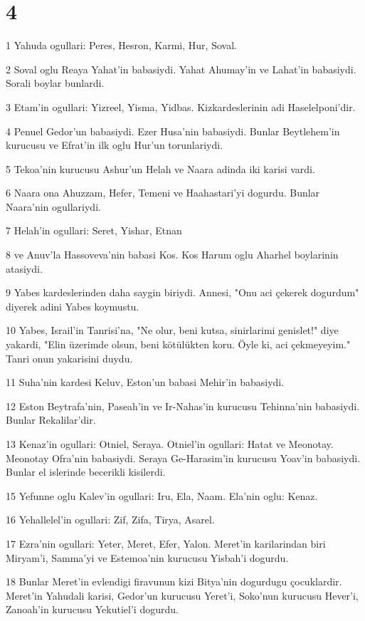 \chapter{4}

\par 1 Yahuda ogullari: Peres, Hesron, Karmi, Hur, Soval.
\par 2 Soval oglu Reaya Yahat'in babasiydi. Yahat Ahumay'in ve Lahat'in babasiydi. Sorali boylar bunlardi.
\par 3 Etam'in ogullari: Yizreel, Yisma, Yidbas. Kizkardeslerinin adi Haselelponi'dir.
\par 4 Penuel Gedor'un babasiydi. Ezer Husa'nin babasiydi. Bunlar Beytlehem'in kurucusu ve Efrat'in ilk oglu Hur'un torunlariydi.
\par 5 Tekoa'nin kurucusu Ashur'un Helah ve Naara adinda iki karisi vardi.
\par 6 Naara ona Ahuzzam, Hefer, Temeni ve Haahastari'yi dogurdu. Bunlar Naara'nin ogullariydi.
\par 7 Helah'in ogullari: Seret, Yishar, Etnan
\par 8 ve Anuv'la Hassoveva'nin babasi Kos. Kos Harum oglu Aharhel boylarinin atasiydi.
\par 9 Yabes kardeslerinden daha saygin biriydi. Annesi, "Onu aci çekerek dogurdum" diyerek adini Yabes koymustu.
\par 10 Yabes, Israil'in Tanrisi'na, "Ne olur, beni kutsa, sinirlarimi genislet!" diye yakardi, "Elin üzerimde olsun, beni kötülükten koru. Öyle ki, aci çekmeyeyim." Tanri onun yakarisini duydu.
\par 11 Suha'nin kardesi Keluv, Eston'un babasi Mehir'in babasiydi.
\par 12 Eston Beytrafa'nin, Paseah'in ve Ir-Nahas'in kurucusu Tehinna'nin babasiydi. Bunlar Rekalilar'dir.
\par 13 Kenaz'in ogullari: Otniel, Seraya. Otniel'in ogullari: Hatat ve Meonotay. Meonotay Ofra'nin babasiydi. Seraya Ge-Harasim'in kurucusu Yoav'in babasiydi. Bunlar el islerinde becerikli kisilerdi.
\par 15 Yefunne oglu Kalev'in ogullari: Iru, Ela, Naam. Ela'nin oglu: Kenaz.
\par 16 Yehallelel'in ogullari: Zif, Zifa, Tirya, Asarel.
\par 17 Ezra'nin ogullari: Yeter, Meret, Efer, Yalon. Meret'in karilarindan biri Miryam'i, Samma'yi ve Estemoa'nin kurucusu Yisbah'i dogurdu.
\par 18 Bunlar Meret'in evlendigi firavunun kizi Bitya'nin dogurdugu çocuklardir. Meret'in Yahudali karisi, Gedor'un kurucusu Yeret'i, Soko'nun kurucusu Hever'i, Zanoah'in kurucusu Yekutiel'i dogurdu.
